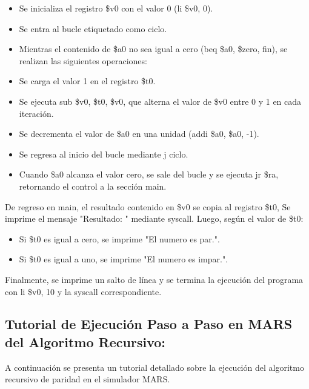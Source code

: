 \documentclass[12pt, letterpaper]{article}
\begin{document}
\begin{itemize}
    \item Se inicializa el registro \$v0 con el valor 0 (li \$v0, 0).
    \item Se entra al bucle etiquetado como ciclo.
    \item Mientras el contenido de \$a0 no sea igual a cero (beq \$a0, \$zero, fin), se realizan las siguientes operaciones:
\end{itemize}
\begin{itemize}
    \item Se carga el valor 1 en el registro \$t0.
    \item Se ejecuta sub \$v0, \$t0, \$v0, que alterna el valor de \$v0 entre 0 y 1 en cada iteración.
    \item Se decrementa el valor de \$a0 en una unidad (addi \$a0, \$a0, -1).
    \item Se regresa al inicio del bucle mediante j ciclo.
\end{itemize}
\begin{itemize}
    \item Cuando \$a0 alcanza el valor cero, se sale del bucle y se ejecuta jr \$ra, retornando el control a la sección main.
\end{itemize}

De regreso en main, el resultado contenido en \$v0 se copia al registro \$t0, Se imprime el mensaje "Resultado: " mediante syscall. Luego, según el valor de \$t0:

\begin{itemize}
    \item Si \$t0 es igual a cero, se imprime "El numero es par.".
    \item Si \$t0 es igual a uno, se imprime "El numero es impar.".
\end{itemize}

Finalmente, se imprime un salto de línea y se termina la ejecución del programa con li \$v0, 10 y la syscall correspondiente.

\subsection*{Tutorial de Ejecución Paso a Paso en MARS del Algoritmo Recursivo:}

A continuación se presenta un tutorial detallado sobre la ejecución del algoritmo recursivo de paridad en el simulador MARS.
\end{document}
